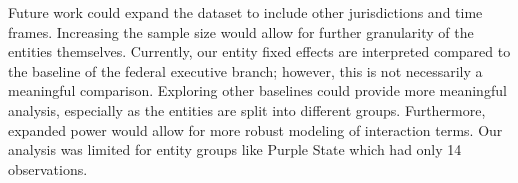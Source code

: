\documentclass{article}
\begin{document}
Future work could expand the dataset to include other jurisdictions and time frames. Increasing the sample size would allow for further granularity of the entities themselves. Currently, our entity fixed effects are interpreted compared to the baseline of the federal executive branch; however, this is not necessarily a meaningful comparison. Exploring other baselines could provide more meaningful analysis, especially as the entities are split into different groups. Furthermore, expanded power would allow for more robust modeling of interaction terms. Our analysis was limited for entity groups like Purple State which had only 14 observations. 
\end{document}
